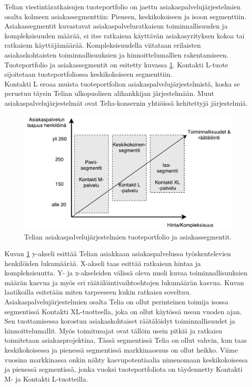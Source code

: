 \documentclass[finnish,12pt,a4paper,pdftex]{article}
\begin{document}
Telian viestintäratkaisujen tuoteportfolio on jaettu asiakaspalvelujärjestelmien osalta kolmeen asiakassegmenttiin: Pieneen, keskikokoiseen ja isoon segmenttiin. Asiakassegmentit kuvastavat asiakaspalveluratkaisun toiminnallisuuden ja kompleksisuuden määrää, ei itse ratkaisua käyttävän asiakasyrityksen kokoa tai ratkaisun käyttäjämäärää. Kompleksisuudella viitataan erilaisten asiakaskohtaisten toiminnallisuuksien ja hinnoittelumallien rakentamiseen. Tuoteportfolio ja asiakassegmentit on esitetty kuvassa \ref{fig:segmentit}. Kontakti L-tuote sijoitetaan tuoteportfoliossa keskikokoiseen segmenttiin.\\

Kontakti L eroaa muista tuoteportfolion asiakaspalvelujärjestelmistä, koska se perustuu täysin Telian ulkopuolisen alihankkijan järjestelmään. Muut asiakaspalvelujärjestelmät ovat Telia-konsernin yhtiöissä kehitettyjä järjestelmiä.\\ 
\begin{figure}[!h]
    \centering
    \includegraphics[scale=0.5]{images/segmentit.pdf}
    \caption{Telian asiakaspalvelujärjestelmien tuoteportfolio ja asiakassegmentit.}
    \label{fig:segmentit}
\end{figure}

Kuvan \ref{fig:segmentit} y-akseli esittää Telian asiakkaan asiakaspalvelussa työskentelevien henkilöiden lukumäärää. X-akseli taas esittää ratkaisun hintaa ja kompleksisuutta. Y- ja x-akseleiden välissä oleva nuoli kuvaa toiminnallisuuksien määrän kasvua ja myös eri räätälöintivaihtoehtojen lukumäärän kasvua. Kuvan laatikoilla esitetään miten tarpeeseen kukin ratkaisu soveltuu.\\

Asiakaspalvelujärjestelmien osalta Telia on ollut perinteinen toimija isossa segmentissä Kontakti XL-tuotteella, joka on ollut käytössä usean vuoden ajan. Sen tuottamisessa korostuu asiakaskohtaiset räätälöidyt toiminnallisuudet ja hinnoittelumallit. Myös toimitusajat ovat tällöin usein pitkiä ja ratkaisu toimitetaan asiakasprojektina. Tässä segmentissä Telia on ollut vahvin, kun taas keskikokoisessa ja pienessä segmentissä markkinaosuus on ollut heikko. Viime vuosina markkinassa onkin nähty kasvupotentiaalia nimenomaan keskikokoisessa ja pienessä segmentissä, jonka vuoksi tuoteportfoliota on täydennetty Kontakti M- ja Kontakti L-tuotteilla.\\
\end{document}
